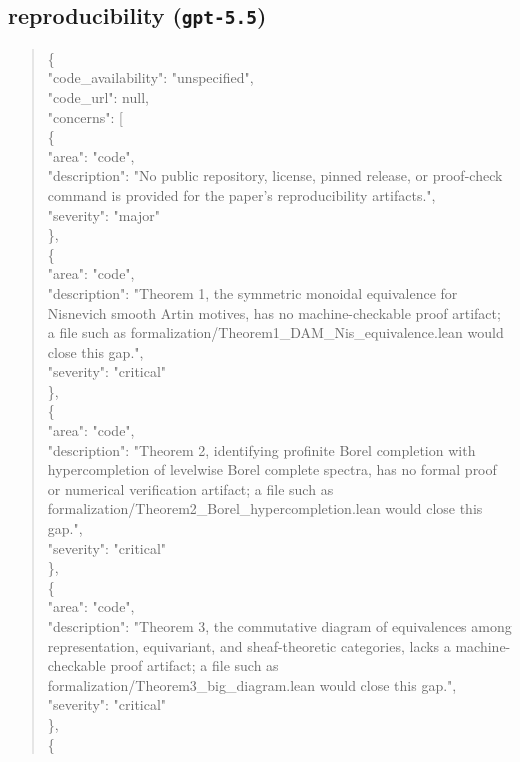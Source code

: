 \documentclass[11pt]{article}
\begin{document}
\subsection*{reproducibility (\texttt{gpt-5.5})}
\begin{quote}\small\ttfamily\raggedright
\{\\
  "code\_availability": "unspecified",\\
  "code\_url": null,\\
  "concerns": [\\
    \{\\
      "area": "code",\\
      "description": "No public repository, license, pinned release, or proof-check command is provided for the paper's reproducibility artifacts.",\\
      "severity": "major"\\
    \},\\
    \{\\
      "area": "code",\\
      "description": "Theorem 1, the symmetric monoidal equivalence for Nisnevich smooth Artin motives, has no machine-checkable proof artifact; a file such as formalization/Theorem1\_DAM\_Nis\_equivalence.lean would close this gap.",\\
      "severity": "critical"\\
    \},\\
    \{\\
      "area": "code",\\
      "description": "Theorem 2, identifying profinite Borel completion with hypercompletion of levelwise Borel complete spectra, has no formal proof or numerical verification artifact; a file such as formalization/Theorem2\_Borel\_hypercompletion.lean would close this gap.",\\
      "severity": "critical"\\
    \},\\
    \{\\
      "area": "code",\\
      "description": "Theorem 3, the commutative diagram of equivalences among representation, equivariant, and sheaf-theoretic categories, lacks a machine-checkable proof artifact; a file such as formalization/Theorem3\_big\_diagram.lean would close this gap.",\\
      "severity": "critical"\\
    \},\\
    \{\\

\end{quote}
\end{document}
